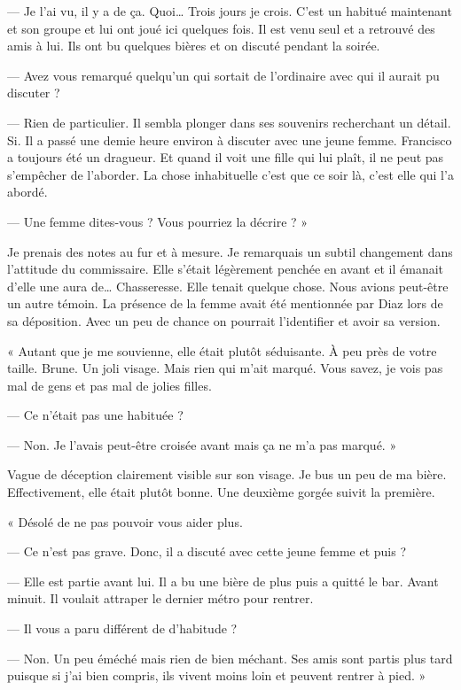 — Je l'ai vu, il y a de ça. Quoi… Trois jours je crois. C'est un habitué maintenant et son groupe et lui ont joué ici 
quelques fois. Il est venu seul et a retrouvé des amis à lui. Ils ont bu quelques bières et on discuté pendant la 
soirée.

— Avez vous remarqué quelqu'un qui sortait de l'ordinaire avec qui il aurait pu discuter ?

— Rien de particulier. Il sembla plonger dans ses souvenirs recherchant un détail. Si. Il a passé une demie heure 
environ à discuter avec une jeune femme. Francisco a toujours été un dragueur. Et quand il voit une fille qui lui 
plaît, il ne peut pas s'empêcher de l'aborder. La chose inhabituelle c'est que ce soir là, c'est elle qui l'a abordé.

— Une femme dites-vous ? Vous pourriez la décrire ? »

Je prenais des notes au fur et à mesure. Je remarquais un subtil changement dans l'attitude du commissaire. Elle 
s'était légèrement penchée en avant et il émanait d'elle une aura de… Chasseresse. Elle tenait quelque chose. Nous 
avions peut-être un autre témoin. La présence de la femme avait été mentionnée par Diaz lors de sa déposition. Avec un 
peu de chance on pourrait l'identifier et avoir sa version.

« Autant que je me souvienne, elle était plutôt séduisante. À peu près de votre taille. Brune. Un joli visage. Mais 
rien qui m'ait marqué. Vous savez, je vois pas mal de gens et pas mal de jolies filles.

— Ce n'était pas une habituée ?

— Non. Je l'avais peut-être croisée avant mais ça ne m'a pas marqué. »

Vague de déception clairement visible sur son visage. Je bus un peu de ma bière. Effectivement, elle était plutôt 
bonne. Une deuxième gorgée suivit la première.

« Désolé de ne pas pouvoir vous aider plus.

— Ce n'est pas grave. Donc, il a discuté avec cette jeune femme et puis ?

— Elle est partie avant lui. Il a bu une bière de plus puis a quitté le bar. Avant minuit. Il voulait attraper le 
dernier métro pour rentrer.

— Il vous a paru différent de d'habitude ?

— Non. Un peu éméché mais rien de bien méchant. Ses amis sont partis plus tard puisque si j'ai bien compris, ils vivent 
moins loin et peuvent rentrer à pied. »

